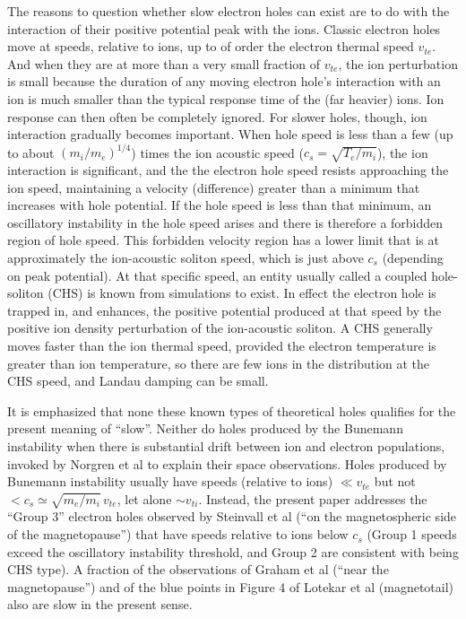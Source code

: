 \documentclass[pre]{revtex4-2}
\begin{document}
The reasons to question whether slow electron holes can exist are to
do with the interaction of their positive potential peak with the
ions. Classic electron holes move at speeds, relative to ions, up to
of order the electron thermal speed
$v_{te}$\cite{Schamel1986a,Hutchinson2017}. And when they are at more
than a very small fraction of $v_{te}$, the ion perturbation is small
because the duration of any moving electron hole's interaction with an
ion is much smaller than the typical response time of the (far
heavier) ions. Ion response can then often be completely ignored. For
slower holes, though, ion interaction gradually becomes important.
When hole speed is less than a few (up to about $(m_i/m_e)^{1/4}$)
times the ion acoustic speed ($c_s=\sqrt{T_e/m_i}$), the ion
interaction is significant, and the the electron hole speed resists
approaching the ion speed\cite{Hutchinson2016,Zhou2016}, maintaining a
velocity (difference) greater than a minimum that increases with hole
potential. If the hole speed is less than that minimum, an oscillatory
instability in the hole speed arises\cite{Zhou2017} and there is
therefore a forbidden region of hole speed. This forbidden velocity
region has a lower limit that is at approximately the ion-acoustic
soliton speed, which is just above $c_s$ (depending on peak
potential\cite{Davidson1972}). At that specific speed, an entity
usually called a coupled hole-soliton (CHS) is known from
simulations\cite{Saeki1991,Saeki1998,Zhou2018} to exist. In effect the
electron hole is trapped in, and enhances, the positive potential
produced at that speed by the positive ion density perturbation of the
ion-acoustic soliton. A CHS generally moves faster than the ion
thermal speed, provided the electron temperature is greater than ion
temperature, so there are few ions in the distribution at the CHS
speed, and Landau damping can be small.

It is emphasized that none these known types of theoretical holes
qualifies for the present meaning of ``slow''. Neither do holes
produced by the Bunemann instability when there is substantial drift
between ion and electron populations, invoked by Norgren et
al\cite{Norgren2015,Norgren2015a} to explain their space
observations. Holes produced\cite{Drake2003,Khotyaintsev2010,Zhou2018}
by Bunemann instability usually have speeds (relative to ions)
$\ll v_{te}$ but not $<c_s\simeq\sqrt{m_e/m_i}\,v_{te}$, let alone
$\sim v_{ti}$.  Instead, the present paper addresses the ``Group 3''
electron holes observed by Steinvall et al\cite{Steinvall2019} (``on
the magnetospheric side of the magnetopause'') that have speeds
relative to ions below $c_s$ (Group 1 speeds exceed the oscillatory
instability threshold, and Group 2 are consistent with being CHS
type). A fraction of the observations of Graham et al\cite{Graham2016}
(``near the magnetopause'') and of the blue points in Figure 4 of
Lotekar et al\cite{Lotekar2020} (magnetotail) also are slow in the
present sense.
\end{document}
